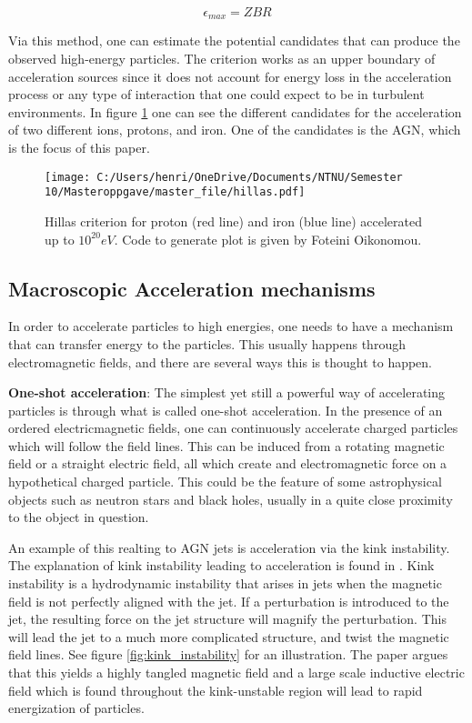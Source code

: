 \begin{equation}
    \epsilon_{max} = ZBR
\end{equation}

Via this method, one can estimate the potential candidates that can produce the observed high-energy particles. 
The criterion works as an upper boundary of acceleration sources since it does not account for energy loss in the acceleration process or any type of interaction that one could expect to be in turbulent environments.
In figure \ref{fig:hillas_c} one can see the different candidates for the acceleration of two different ions, protons, and iron. One of the candidates is the AGN, which is the focus of this paper.

\begin{figure}
    \centering
    \texttt{[image: C:/Users/henri/OneDrive/Documents/NTNU/Semester 10/Masteroppgave/master\_file/hillas.pdf]}
    \caption{Hillas criterion for proton (red line) and iron (blue line) accelerated up to $10^{20}eV$. Code to generate plot is given by Foteini Oikonomou.}
    \label{fig:hillas_c}
\end{figure}


\subsection{Macroscopic Acceleration mechanisms}
\label{sec:acceleration_mechanisms}
In order to accelerate particles to high energies, one needs to have a mechanism that can transfer energy to the particles. This usually happens through electromagnetic fields, and there are several ways this is thought to happen.

\textbf{One-shot acceleration}:
The simplest yet still a powerful way of accelerating particles is through what is called one-shot acceleration. In the presence of an ordered electricmagnetic fields, one can continuously accelerate charged particles which will follow the field lines. This can be induced from a rotating magnetic field or a straight electric field, all which create and electromagnetic force on a hypothetical charged particle. 
This could be the feature of some astrophysical objects such as neutron stars and black holes, usually in a quite close proximity to the object in question.%

An example of this realting to AGN jets is acceleration via the kink instability. The explanation of kink instability leading to acceleration is found in \cite{Alves_2018}. Kink instability is a hydrodynamic instability that arises in jets when the magnetic field is not perfectly aligned with the jet. If a perturbation is introduced to the jet, the resulting force on the jet structure will magnify the perturbation. This will lead the jet to a much more complicated structure, and twist the magnetic field lines. See figure \ref{fig:kink_instability} for an illustration. The paper argues that this yields a highly tangled magnetic field and a large scale inductive electric field which is found throughout the kink-unstable region will lead to rapid energization of particles.  

